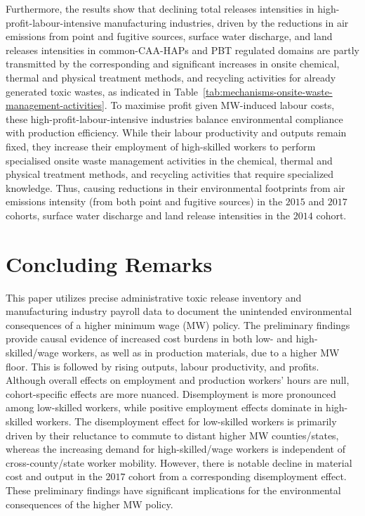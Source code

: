 \documentclass{C:/Users/david/OneDrive/Documents/ULMS/PhD/Thesis/chapter3/src/climate_change/latex/Economic_Journal/OUP-EJ}
\begin{document}
    Furthermore, the results show that declining total releases intensities in high-profit-labour-intensive manufacturing industries, driven by the reductions in air emissions from point and fugitive sources, surface water discharge, and land releases intensities in common-CAA-HAPs and PBT regulated domains are partly transmitted by the corresponding and significant increases in onsite chemical, thermal and physical treatment methods, and recycling activities for already generated toxic wastes, as indicated in Table~\ref{tab:mechanisms-onsite-waste-management-activities}. To maximise profit given MW-induced labour costs, these high-profit-labour-intensive industries balance environmental compliance with production efficiency. While their labour productivity and outputs remain fixed, they increase their employment of high-skilled workers to perform specialised onsite waste management activities in the chemical, thermal and physical treatment methods, and recycling activities that require specialized knowledge. Thus, causing reductions in their environmental footprints from air emissions intensity (from both point and fugitive sources) in the $2015$ and $2017$ cohorts, surface water discharge and land release intensities in the $2014$ cohort.


    \section{Concluding Remarks}\label{sec:concluding-remarks}
    This paper utilizes precise administrative toxic release inventory and manufacturing industry payroll data to document the unintended environmental consequences of a higher minimum wage (MW) policy. The preliminary findings provide causal evidence of increased cost burdens in both low- and high-skilled/wage workers, as well as in production materials, due to a higher MW floor. This is followed by rising outputs, labour productivity, and profits. Although overall effects on employment and production workers' hours are null, cohort-specific effects are more nuanced. Disemployment is more pronounced among low-skilled workers, while positive employment effects dominate in high-skilled workers. The disemployment effect for low-skilled workers is primarily driven by their reluctance to commute to distant higher MW counties/states, whereas the increasing demand for high-skilled/wage workers is independent of cross-county/state worker mobility. However, there is notable decline in material cost and output in the $2017$ cohort from a corresponding disemployment effect. These preliminary findings have significant implications for the environmental consequences of the higher MW policy.
\end{document}
